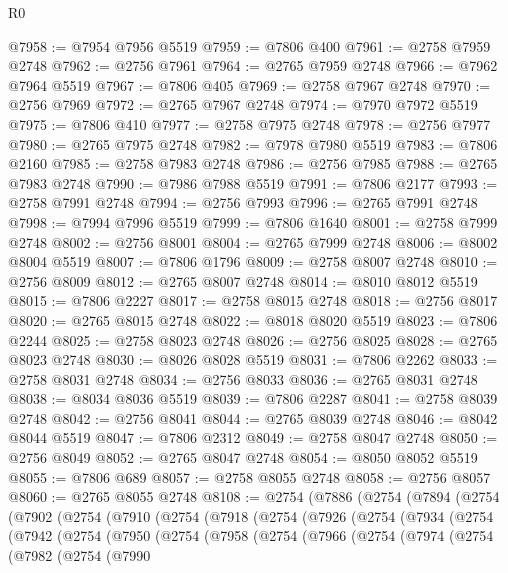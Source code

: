 \begin{lexlean}{R0}
\begin{coremodule}
@7958 := @7954 @7956 @5519
@7959 := @7806 @400
@7961 := @2758 @7959 @2748
@7962 := @2756 @7961
@7964 := @2765 @7959 @2748
@7966 := @7962 @7964 @5519
@7967 := @7806 @405
@7969 := @2758 @7967 @2748
@7970 := @2756 @7969
@7972 := @2765 @7967 @2748
@7974 := @7970 @7972 @5519
@7975 := @7806 @410
@7977 := @2758 @7975 @2748
@7978 := @2756 @7977
@7980 := @2765 @7975 @2748
@7982 := @7978 @7980 @5519
@7983 := @7806 @2160
@7985 := @2758 @7983 @2748
@7986 := @2756 @7985
@7988 := @2765 @7983 @2748
@7990 := @7986 @7988 @5519
@7991 := @7806 @2177
@7993 := @2758 @7991 @2748
@7994 := @2756 @7993
@7996 := @2765 @7991 @2748
@7998 := @7994 @7996 @5519
@7999 := @7806 @1640
@8001 := @2758 @7999 @2748
@8002 := @2756 @8001
@8004 := @2765 @7999 @2748
@8006 := @8002 @8004 @5519
@8007 := @7806 @1796
@8009 := @2758 @8007 @2748
@8010 := @2756 @8009
@8012 := @2765 @8007 @2748
@8014 := @8010 @8012 @5519
@8015 := @7806 @2227
@8017 := @2758 @8015 @2748
@8018 := @2756 @8017
@8020 := @2765 @8015 @2748
@8022 := @8018 @8020 @5519
@8023 := @7806 @2244
@8025 := @2758 @8023 @2748
@8026 := @2756 @8025
@8028 := @2765 @8023 @2748
@8030 := @8026 @8028 @5519
@8031 := @7806 @2262
@8033 := @2758 @8031 @2748
@8034 := @2756 @8033
@8036 := @2765 @8031 @2748
@8038 := @8034 @8036 @5519
@8039 := @7806 @2287
@8041 := @2758 @8039 @2748
@8042 := @2756 @8041
@8044 := @2765 @8039 @2748
@8046 := @8042 @8044 @5519
@8047 := @7806 @2312
@8049 := @2758 @8047 @2748
@8050 := @2756 @8049
@8052 := @2765 @8047 @2748
@8054 := @8050 @8052 @5519
@8055 := @7806 @689
@8057 := @2758 @8055 @2748
@8058 := @2756 @8057
@8060 := @2765 @8055 @2748
@8108 := @2754
    (@7886
      (@2754
        (@7894
          (@2754
            (@7902
              (@2754
                (@7910
                  (@2754
                    (@7918
                      (@2754
                        (@7926
                          (@2754
                            (@7934
                              (@2754
                                (@7942
                                  (@2754
                                    (@7950
                                      (@2754
                                        (@7958
                                          (@2754
                                            (@7966
                                              (@2754
                                                (@7974
                                                  (@2754
                                                    (@7982
                                                      (@2754
                                                        (@7990

\end{coremodule}
\end{lexlean}

